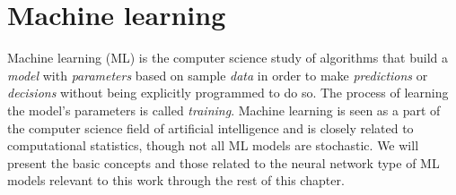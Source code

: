 



\section{Machine learning}
Machine learning (ML) is the computer science study of algorithms that build a \emph{model} with \emph{parameters} based on sample \emph{data} in order to make \emph{predictions} or \emph{decisions} without being explicitly programmed to do so. The process of learning the model's parameters is called \emph{training}. Machine learning is seen as a part of the computer science field of artificial intelligence and is closely related to computational statistics, though not all ML models are stochastic. We will present the basic concepts and those related to the neural network type of ML models relevant to this work through the rest of this chapter. 

